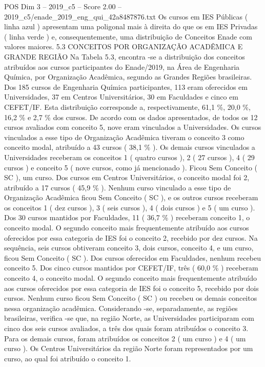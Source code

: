 \begin{textsample}{POS Dim 3 – 2019\_c5 – Score 2.00 – 2019\_c5/enade\_2019\_eng\_qui\_42a8487876.txt}
Os cursos em IES Públicas ( linha azul ) apresentam uma poligonal mais à direita do que os em IES Privadas ( linha verde ) e, consequentemente, uma distribuição de Conceitos Enade com valores maiores. 5.3 CONCEITOS POR ORGANIZAÇÃO ACADÊMICA E GRANDE REGIÃO Na Tabela 5.3, encontra -se a distribuição dos conceitos atribuídos aos cursos participantes do Enade/2019, na Área de Engenharia Química, por Organização Acadêmica, segundo as Grandes Regiões brasileiras.
Dos 185 cursos de Engenharia Química participantes, 113 eram oferecidos em Universidades, 37 em Centros Universitários, 30 em Faculdades e cinco em CEFET/IF.
Esta distribuição corresponde a, respectivamente, 61,1 \%, 20,0 \%, 16,2 \% e 2,7 \% dos cursos.
De acordo com os dados apresentados, de todos os 12 cursos avaliados com conceito 5, nove eram vinculados a Universidades.
Os cursos vinculados a esse tipo de Organização Acadêmica tiveram o conceito 3 como conceito modal, atribuído a 43 cursos ( 38,1 \% ).
Os demais cursos vinculados a Universidades receberam os conceitos 1 ( quatro cursos ), 2 ( 27 cursos ), 4 ( 29 cursos ) e conceito 5 ( nove cursos, como já mencionado ).
Ficou Sem Conceito ( SC ), um curso.
Dos cursos em Centros Universitários, o conceito modal foi 2, atribuído a 17 cursos ( 45,9 \% ).
Nenhum curso vinculado a esse tipo de Organização Acadêmica ficou Sem Conceito ( SC ), e os outros cursos receberam os conceitos 1 ( dez cursos ), 3 ( seis cursos ), 4 ( dois cursos ) e 5 ( um curso ).
Dos 30 cursos mantidos por Faculdades, 11 ( 36,7 \% ) receberam conceito 1, o conceito modal.
O segundo conceito mais frequentemente atribuído aos cursos oferecidos por essa categoria de IES foi o conceito 2, recebido por dez cursos.
Na sequência, seis cursos obtiveram conceito 3, dois cursos, conceito 4, e um curso, ficou Sem Conceito ( SC ).
Dos cursos oferecidos em Faculdades, nenhum recebeu conceito 5.
Dos cinco cursos mantidos por CEFET/IF, três ( 60,0 \% ) receberam conceito 4, o conceito modal.
O segundo conceito mais frequentemente atribuído aos cursos oferecidos por essa categoria de IES foi o conceito 5, recebido por dois cursos.
Nenhum curso ficou Sem Conceito ( SC ) ou recebeu os demais conceitos nessa organização acadêmica.
Considerando -se, separadamente, as regiões brasileiras, verifica -se que, na região Norte, as Universidades participaram com cinco dos seis cursos avaliados, a três dos quais foram atribuídos o conceito 3.
Para os demais cursos, foram atribuídos os conceitos 2 ( um curso ) e 4 ( um curso ).
Os Centros Universitários da região Norte foram representados por um curso, ao qual foi atribuído o conceito 1.

\end{textsample}
